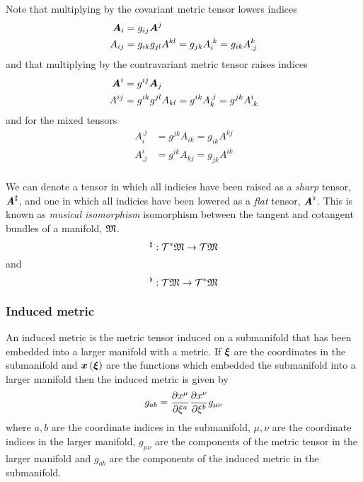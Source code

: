 Note that multiplying by the covariant metric tensor lowers indices \ie
\begin{equation}
  \begin{split}
    \boldsymbol{A}_{i} &= g_{ij}\boldsymbol{A}^{j} \\
    A_{ij} &= g_{ik}g_{jl}A^{kl} = g_{jk}A_{i}^{.k} = g_{ik}A^{k}_{.j} 
  \end{split}
\end{equation}
and that multiplying by the contravariant metric tensor raises indices \ie
\begin{equation}
  \begin{split}
  \boldsymbol{A}^{i} &=  g^{ij}\boldsymbol{A}_{j} \\
   A^{ij} &= g^{ik}g^{jl}A_{kl} = g^{ik}A_{k}^{.j} = g^{jk}A^{i}_{.k}
  \end{split}
\end{equation}
and for the mixed tensors
\begin{equation}
  \begin{split}
  A_{i}^{.j} &= g^{jk}A_{ik} = g_{ik}A^{kj} \\
  A^{i}_{.j} &= g^{ik}A_{kj} = g_{jk}A^{ik} \\
  \end{split}
\end{equation}

We can denote a tensor in which all indicies have been raised as a
\emph{sharp} tensor, $ \boldsymbol{\mathit{A}}^{\sharp} $, and one in which all indicies have been lowered as a
\emph{flat} tensor, $\boldsymbol{\mathit{A}}^{\flat}$. This is known as \emph{musical isomorphism} \ie
isomorphism between the tangent and cotangent bundles of a manifold, $ \mathfrak{M} $.
\begin{equation}
   ^{\sharp} :   \mathcal{T} ^{*}   \mathfrak{M}  \rightarrow  \mathcal{T}   \mathfrak{M}  
\end{equation}
and
\begin{equation}
  ^{\flat}:  \mathcal{T}   \mathfrak{M}  \rightarrow   \mathcal{T} ^{*}   \mathfrak{M}  
\end{equation}

\subsubsection{Induced metric}

An induced metric is the metric tensor induced on a submanifold that has been
embedded into a larger manifold with a metric. If $\boldsymbol{\xi}$ are the
coordinates in the submanifold and $ \boldsymbol{x}\left( \boldsymbol{\xi} \right) $ are the
functions which embedded the submanifold into a larger manifold then the
induced metric is given by
\begin{equation}
  g_{ab}= \dfrac{\partial x^{\mu}}{\partial \xi^{a}}  \dfrac{\partial x^{\nu}}{\partial \xi^{b}} g_{\mu\nu}
\end{equation}
where $a, b$ are the coordinate indices in the submanifold, $\mu, \nu$ are the
coordinate indices in the larger manifold, $g_{\mu\nu}$ are the components of
the metric tensor in the larger manifold and $g_{ab}$ are the components of
the induced metric in the submanifold.

